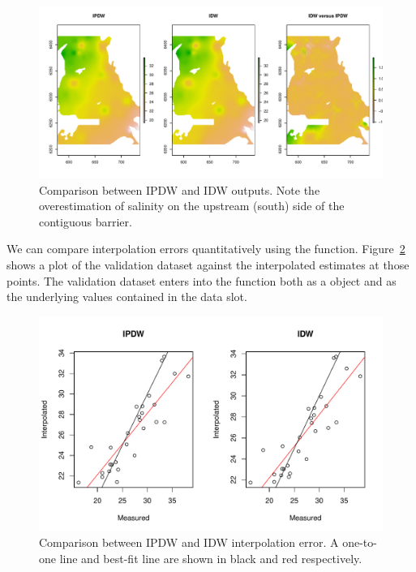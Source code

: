 \documentclass[nojss,shortnames]{jss}
\begin{document}
\begin{figure}[h!]
\begin{center}
\includegraphics{ipdw-figure2}
\end{center}
\vspace{-20pt}
\caption{Comparison between IPDW and IDW outputs. Note the overestimation of salinity on the upstream (south) side of the contiguous barrier. }
\label{fig:two}
\end{figure}
\FloatBarrier

We can compare interpolation errors quantitatively using the  function. Figure~\ref{fig:three} shows a plot of the validation dataset against the interpolated estimates at those points. The validation dataset enters into the function both as a  object and as the underlying values contained in the data slot.  

\begin{Schunk}
\end{Schunk}

\begin{figure}[h!]
\begin{center}
\includegraphics{ipdw-figure3}
\end{center}
\vspace{-20pt}
\caption{Comparison between IPDW and IDW interpolation error.  A one-to-one line and best-fit line are shown in black and red respectively.}
\label{fig:three}
\end{figure}
\FloatBarrier
\end{document}
